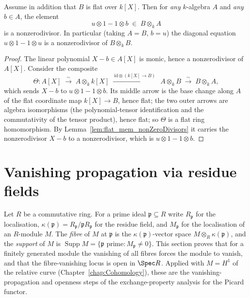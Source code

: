 \begin{theorem}
  \label{thm:diagonal_regularity_engine}
  \leanok
  Assume in addition that \(B\) is flat over \(k[X]\). Then for \emph{any} \(k\)-algebra \(A\) and
  \emph{any} \(b \in A\), the element
  \[
    u \otimes 1 - 1 \otimes b \;\in\; B \otimes_k A
  \]
  is a nonzerodivisor. In particular (taking \(A = B\), \(b = u\)) the diagonal equation \(u
  \otimes 1 - 1 \otimes u\) is a nonzerodivisor of \(B \otimes_k B\).
\end{theorem}
\begin{proof}
  \leanok
  The linear polynomial \(X - b \in A[X]\) is monic, hence a nonzerodivisor of \(A[X]\). Consider
  the composite
  \[
    \Theta \colon A[X] \;\xrightarrow{\ \sim\ }\; A \otimes_k k[X]
    \;\xrightarrow{\ \mathrm{id} \otimes (k[X] \to B)\ }\; A \otimes_k B
    \;\xrightarrow{\ \sim\ }\; B \otimes_k A,
  \]
  which sends \(X - b\) to \(u \otimes 1 - 1 \otimes b\). Its middle arrow is the base change
  along \(A\) of the flat coordinate map \(k[X] \to B\), hence flat; the two outer arrows are
  algebra isomorphisms (the polynomial-tensor identification and the commutativity of the tensor
  product), hence flat; so \(\Theta\) is a flat ring homomorphism. By
  Lemma~\ref{lem:flat_mem_nonZeroDivisors} it carries the nonzerodivisor \(X - b\) to a
  nonzerodivisor, which is \(u \otimes 1 - 1 \otimes b\).
\end{proof}

\section{Vanishing propagation via residue fields}
\label{sec:nakayama_vanishing}

Let \(R\) be a commutative ring. For a prime ideal \(\mathfrak p \subseteq R\) write
\(R_{\mathfrak p}\) for the localisation, \(\kappa(\mathfrak p) =
R_{\mathfrak p}/\mathfrak p R_{\mathfrak p}\) for the residue field, and
\(M_{\mathfrak p}\) for the localisation of an \(R\)-module \(M\). The \emph{fibre} of
\(M\) at \(\mathfrak p\) is the \(\kappa(\mathfrak p)\)-vector space
\(M \otimes_R \kappa(\mathfrak p)\), and the \emph{support} of \(M\) is
\(\operatorname{Supp} M = \{\mathfrak p \text{ prime} : M_{\mathfrak p} \neq 0\}\).
This section proves that for a finitely generated module the vanishing of all fibres
forces the module to vanish, and that the fibre-vanishing locus is open in
\(\Spec R\). Applied with \(M = H^1\) of the relative curve
(Chapter~\ref{chap:Cohomology}), these are the vanishing-propagation and openness steps
of the exchange-property analysis for the Picard functor.

